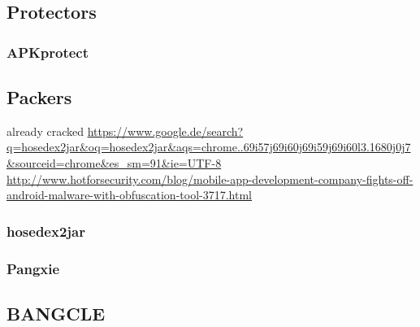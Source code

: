 \subsection{Protectors}
\subsubsection{APKprotect}
\subsection{Packers}
already cracked \url{https://www.google.de/search?q=hosedex2jar&oq=hosedex2jar&aqs=chrome..69i57j69i60j69i59j69i60l3.1680j0j7&sourceid=chrome&es_sm=91&ie=UTF-8}\newline
\url{http://www.hotforsecurity.com/blog/mobile-app-development-company-fights-off-android-malware-with-obfuscation-tool-3717.html}\newline
\subsubsection{hosedex2jar}
\subsubsection{Pangxie}
\subsection{BANGCLE}
